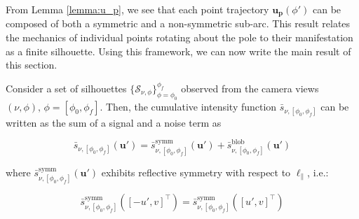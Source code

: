 From Lemma \ref{lemma:u_p}, we see that each point trajectory $\mathbf{u}_\mathbf{p}(\phi')$ can be composed of both a symmetric and a non-symmetric sub-arc. This result relates the mechanics of individual points rotating about the pole to their manifestation as a finite silhouette.  Using this framework, we can now write the main result of this section.

\begin{theorem}
\label{th:s_bar}
    Consider a set of silhouettes $\{\mathcal{S}_{\nu,\phi}\}_{\phi=\phi_0}^{\phi_f}$ observed from the camera views $(\nu,\phi),\,\phi=[\phi_0,\phi_f]$. Then, the cumulative intensity function $\bar{s}_{\nu,[\phi_0,\phi_f]}$ can be written as the sum of a signal and a noise term as

    \begin{equation}
        \bar{s}_{\nu,[\phi_0,\phi_f]}(\mathbf{u}') = \bar{s}^{\mathrm{symm}}_{\nu,[\phi_0,\phi_f]}(\mathbf{u}') + \bar{s}^{\mathrm{blob}}_{\nu,[\phi_0,\phi_f]}(\mathbf{u}')
    \end{equation}

    where $\bar{s}^{\mathrm{symm}}_{\nu,[\phi_0,\phi_f]}(\mathbf{u}')$ exhibits reflective symmetry with respect to $\ell_\parallel$, i.e.:

    \begin{equation}
        \bar{s}^{\mathrm{symm}}_{\nu,[\phi_0,\phi_f]}([-u',v]^\top) = \bar{s}^{\mathrm{symm}}_{\nu,[\phi_0,\phi_f]}([u',v]^\top)
    \end{equation}

\end{theorem}

